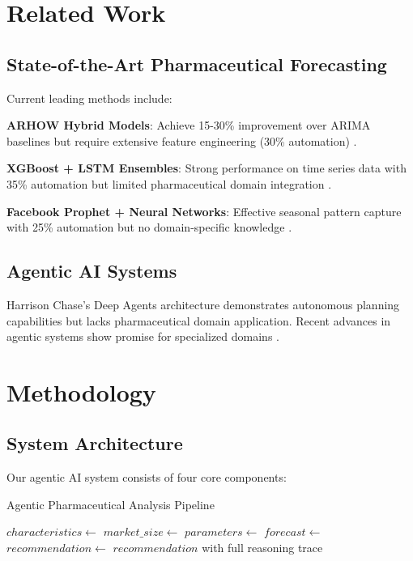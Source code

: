 \documentclass{article}
\begin{document}
\section{Related Work}

\subsection{State-of-the-Art Pharmaceutical Forecasting}

Current leading methods include:

\textbf{ARHOW Hybrid Models}: Achieve 15-30\% improvement over ARIMA baselines but require extensive feature engineering (30\% automation) \cite{arhow_2024}.

\textbf{XGBoost + LSTM Ensembles}: Strong performance on time series data with 35\% automation but limited pharmaceutical domain integration \cite{xgboost_pharma_2024}.

\textbf{Facebook Prophet + Neural Networks}: Effective seasonal pattern capture with 25\% automation but no domain-specific knowledge \cite{prophet_pharma_2024}.

\subsection{Agentic AI Systems}

Harrison Chase's Deep Agents architecture \cite{chase_agents_2024} demonstrates autonomous planning capabilities but lacks pharmaceutical domain application. Recent advances in agentic systems show promise for specialized domains \cite{agents_science_2025}.

\section{Methodology}

\subsection{System Architecture}

Our agentic AI system consists of four core components:

\begin{algorithm}
\caption{Agentic Pharmaceutical Analysis Pipeline}
\begin{algorithmic}[1]
    \State $characteristics \gets$ 
    \State $market\_size \gets$ 
    \State $parameters \gets$ 
    \State $forecast \gets$ 
    \State $recommendation \gets$ 
    \State \Return $recommendation$ with full reasoning trace
\EndProcedure
\end{algorithmic}
\end{algorithm}
\end{document}

